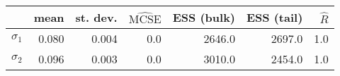 \begin{tabular}{lrrrrrr}
\toprule
{} &   mean &  st. dev. &  $\widehat{\mathrm{MCSE}}$ &  ESS (bulk) &  ESS (tail) &  $\widehat{R}$ \\
\midrule
$\sigma_1$ &  0.080 &     0.004 &                        0.0 &      2646.0 &      2697.0 &            1.0 \\
$\sigma_2$ &  0.096 &     0.003 &                        0.0 &      3010.0 &      2454.0 &            1.0 \\
\bottomrule
\end{tabular}
